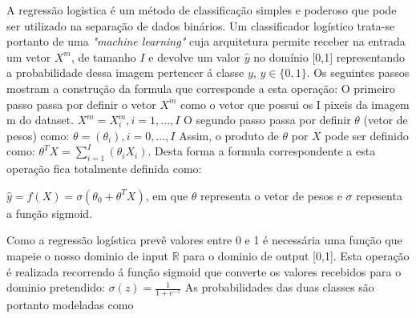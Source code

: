 A regressão logistica é um método de classificação simples e poderoso que pode ser utilizado na separação de dados binários. Um classificador logístico trata-se portanto de uma \textit{"machine learning"} cuja arquitetura permite receber na entrada um vetor $X^m$, de tamanho $I$ e devolve um valor $\hat{y}$ no domínio [0,1] representando a probabilidade dessa imagem pertencer á classe $y$, $y \in \{0,1\}$\cite{ref2,ref5}. Os seguintes passos mostram a construção da formula que corresponde a esta operação:\newline
\hfill\newline
O primeiro passo passa por definir o vetor $X^m$ como o vetor que possui os I pixeis da imagem m do dataset.\newline
\hfill\newline
$X^m=X_i^m, i=1,...,I$
\hfill\newline
\hfill\newline
O segundo passo passa por definir $\theta$ (vetor de pesos) como:\hfill\newline
\hfill\newline
$\theta = (\theta_i),i=0,...,I$
\hfill\newline
\hfill\newline
Assim, o produto de $\theta$ por $X$ pode ser definido como\cite{ref2,ref3}:\hfill\newline
\hfill\newline
 $\theta^T X = \sum_{i=1}^{I} (\theta_i X_i)$.
\hfill\newline
\hfill\newline
Desta forma a formula correspondente a esta operação fica totalmente definida como\cite{ref2}:

\hfill\newline
$\hat{y} = f(X) = \sigma(\theta_0 + \theta^T X)$, em que $\theta$ representa o vetor de pesos e $\sigma$ repesenta a função sigmoid.
\hfill\newline

Como a regressão logística prevê valores entre 0 e 1 é necessária uma função que mapeie o nosso dominio de input $\mathbb{R}$ para o dominio de output [0,1]. Esta operação é realizada recorrendo á função sigmoid que converte os valores recebidos para o dominio pretendido\cite{ref2}:
\hfill\newline
\hfill\newline
$\sigma(z) = \frac{1}{1+e^{-z}}$
\hfill\newline
\hfill\newline
As probabilidades das duas classes são portanto modeladas como \newline

